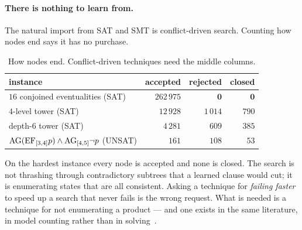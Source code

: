 \paragraph{There is nothing to learn from.} The natural import from SAT and SMT
is conflict-driven search. Counting how nodes end says it has no purchase.

\begin{table}[t]
\centering
\caption{How nodes end. Conflict-driven techniques need the middle columns.}
\label{tab:conflicts}
\begin{tabular}{@{}lrrr@{}}
\toprule
instance & accepted & rejected & closed \\
\midrule
$16$ conjoined eventualities (SAT)  & $262\,975$ & $\mathbf{0}$ & $\mathbf{0}$ \\
$4$-level tower (SAT)               & $12\,928$  & $1\,014$ & $790$ \\
depth-$6$ tower (SAT)               & $4\,281$   & $609$   & $385$ \\
$\mathrm{AG}(\mathrm{EF}_{[3,4]}p)\wedge\mathrm{AG}_{[4,5]}\neg p$ (UNSAT)
                                    & $161$      & $108$   & $53$ \\
\bottomrule
\end{tabular}
\end{table}

On the hardest instance every node is accepted and none is closed. The search
is not thrashing through contradictory subtrees that a learned clause would cut;
it is enumerating states that are all consistent. Asking a technique for
\emph{failing faster} to speed up a search that never fails is the wrong
request. What is needed is a technique for not enumerating a product --- and one
exists in the same literature, in model counting rather than in
solving~\cite{BacchusDalmaoPitassi2003,SangBeameKautz2005}.
